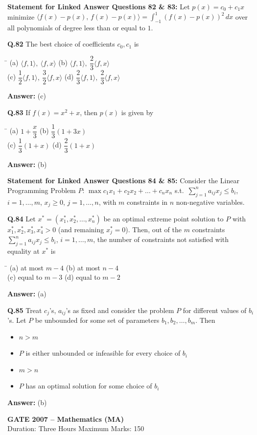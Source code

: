 \documentclass[11pt,a4paper]{article}
\newcommand{\optsfour}[4]{%
  \begin{tabbing}
    \hspace{0.48\linewidth}\=\kill
    (a) #1 \> (b) #2 \\[2pt]
    (c) #3 \> (d) #4
  \end{tabbing}%
}
\newcommand{\optslist}[4]{%
  \begin{itemize}
    \setlength{\itemsep}{2pt}\setlength{\parskip}{0pt}
    \item[(a)] #1
    \item[(b)] #2
    \item[(c)] #3
    \item[(d)] #4
  \end{itemize}%
}
\newcommand{\ans}[1]{\textbf{Answer:} #1\par\medskip}
\begin{document}
\medskip
\textbf{Statement for Linked Answer Questions 82 \& 83:}
Let $p(x) = c_0 + c_1 x$ minimize $\langle f(x) - p(x),\, f(x) - p(x) \rangle = \displaystyle\int_{-1}^{1} (f(x) - p(x))^2\,dx$ over all polynomials of degree less than or equal to $1$.

\textbf{Q.82} The best choice of coefficients $c_0, c_1$ is
\optsfour{$\langle f, 1 \rangle,\ \langle f, x \rangle$}{$\langle f, 1 \rangle,\ \dfrac{2}{3}\langle f, x \rangle$}{$\dfrac{1}{2}\langle f, 1 \rangle,\ \dfrac{3}{2}\langle f, x \rangle$}{$\dfrac{2}{3}\langle f, 1 \rangle,\ \dfrac{2}{3}\langle f, x \rangle$}
\ans{(c)}

\textbf{Q.83} If $f(x) = x^2 + x$, then $p(x)$ is given by
\optsfour{$1 + \dfrac{x}{3}$}{$\dfrac{1}{3}(1 + 3x)$}{$\dfrac{1}{3}(1 + x)$}{$\dfrac{2}{3}(1 + x)$}
\ans{(b)}

\medskip
\textbf{Statement for Linked Answer Questions 84 \& 85:}
Consider the Linear Programming Problem $P$: $\max c_1 x_1 + c_2 x_2 + \dots + c_n x_n$ s.t.\ $\displaystyle\sum_{j=1}^{n} a_{ij} x_j \le b_i$, $i = 1, \dots, m$, $x_j \ge 0$, $j = 1, \dots, n$, with $m$ constraints in $n$ non-negative variables.

\textbf{Q.84} Let $x^* = (x_1^*, x_2^*, \dots, x_n^*)$ be an optimal extreme point solution to $P$ with $x_1^*, x_2^*, x_3^*, x_4^* > 0$ (and remaining $x_j^* = 0$). Then, out of the $m$ constraints $\displaystyle\sum_{j=1}^{n} a_{ij} x_j \le b_i$, $i = 1, \dots, m$, the number of constraints not satisfied with equality at $x^*$ is
\optsfour{at most $m - 4$}{at most $n - 4$}{equal to $m - 3$}{equal to $m - 2$}
\ans{(a)}

\textbf{Q.85} Treat $c_j$'s, $a_{ij}$'s as fixed and consider the problem $P$ for different values of $b_i$'s. Let $P$ be unbounded for some set of parameters $b_1, b_2, \dots, b_m$. Then
\optslist{$n > m$}{$P$ is either unbounded or infeasible for every choice of $b_i$}{$m > n$}{$P$ has an optimal solution for some choice of $b_i$}
\ans{(b)}

\newpage


\begin{center}
  {\Large\bfseries GATE 2007 -- Mathematics (MA)}\\[4pt]
  {\small Duration: Three Hours \quad\textbar\quad Maximum Marks: 150}
\end{center}
\end{document}
